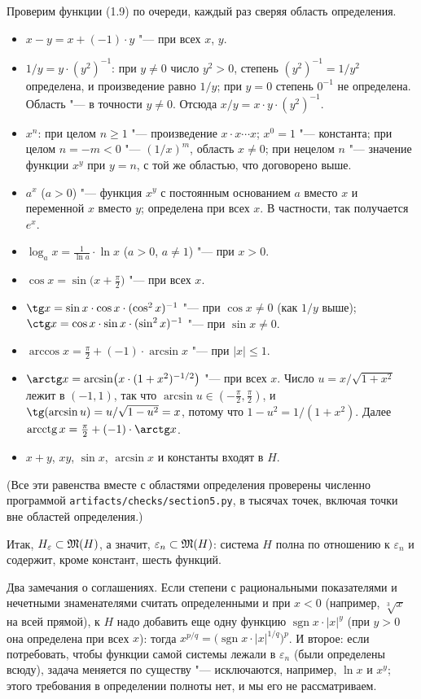 \begin{solution}[4 (\S\,5)]
Проверим функции (1.9) по очереди, каждый раз сверяя область определения.
\begin{itemize}[leftmargin=1.2em,itemsep=2pt]
\item $x-y=x+(-1)\cdot y$ "--- при всех $x$, $y$.
\item $1/y=y\cdot(y^2)^{-1}$: при $y\ne0$ число $y^2>0$, степень
  $(y^2)^{-1}=1/y^2$ определена, и произведение равно $1/y$; при $y=0$ степень
  $0^{-1}$ не определена. Область "--- в точности $y\ne0$. Отсюда
  $x/y=x\cdot y\cdot(y^2)^{-1}$.
\item $x^n$: при целом $n\ge1$ "--- произведение $x\cdot x\cdots x$; $x^0=1$
  "--- константа; при целом $n=-m<0$ "--- $(1/x)^m$, область $x\ne0$; при
  нецелом $n$ "--- значение функции $x^y$ при $y=n$, с той же областью, что
  договорено выше.
\item $a^x$ ($a>0$) "--- функция $x^y$ с постоянным основанием $a$ вместо $x$
  и переменной $x$ вместо $y$; определена при всех $x$. В частности, так
  получается $e^x$.
\item $\log_ax=\frac1{\ln a}\cdot\ln x$ ($a>0$, $a\ne1$) "--- при $x>0$.
\item $\cos x=\sin\bigl(x+\frac\pi2\bigr)$ "--- при всех $x$.
\item $\tg x=\sin x\cdot\cos x\cdot(\cos^2x)^{-1}$ "--- при $\cos x\ne0$ (как
  $1/y$ выше); $\ctg x=\cos x\cdot\sin x\cdot(\sin^2x)^{-1}$ "--- при $\sin x\ne0$.
\item $\arccos x=\frac\pi2+(-1)\cdot\arcsin x$ "--- при $|x|\le1$.
\item $\arctg x=\arcsin\bigl(x\cdot(1+x^2)^{-1/2}\bigr)$ "--- при всех $x$. Число
  $u=x/\sqrt{1+x^2}$ лежит в $(-1,1)$, так что $\arcsin u\in(-\frac\pi2,\frac\pi2)$,
  и $\tg(\arcsin u)=u/\sqrt{1-u^2}=x$, потому что $1-u^2=1/(1+x^2)$. Далее
  $\operatorname{arcctg}x=\frac\pi2+(-1)\cdot\arctg x$.
\item $x+y$, $xy$, $\sin x$, $\arcsin x$ и константы входят в $H$.
\end{itemize}
(Все эти равенства вместе с областями определения проверены численно
программой \texttt{artifacts/checks/section5.py}, в тысячах точек, включая
точки вне областей определения.)

Итак, $H_\varepsilon\subset\mathfrak M(H)$, а значит, $\varepsilon_n\subset\mathfrak M(H)$:
система $H$ полна по отношению к $\varepsilon_n$ и содержит, кроме констант,
шесть функций.

Два замечания о соглашениях. Если степени с рациональными показателями
и нечетными знаменателями считать определенными и при $x<0$ (например,
$\sqrt[3]{x}$ на всей прямой), к $H$ надо добавить еще одну функцию
$\operatorname{sgn}x\cdot|x|^y$ (при $y>0$ она определена при всех $x$): тогда
$x^{p/q}=\bigl(\operatorname{sgn}x\cdot|x|^{1/q}\bigr)^p$. И второе: если
потребовать, чтобы функции самой системы лежали в $\varepsilon_n$ (были
определены всюду), задача меняется по существу "--- исключаются, например,
$\ln x$ и $x^y$; этого требования в определении полноты нет, и мы его
не рассматриваем.


\end{solution}
